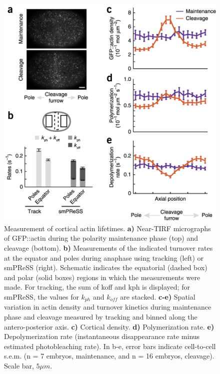 \begin{figure}[h!]
	\centering
	\includegraphics[width=0.8\hsize]{nmeth/nmethF4.jpg}
	\caption{Measurement of cortical actin lifetimes.  \textbf{a)} Near-TIRF micrographs of GFP::actin during the polarity maintenance phase (top) and cleavage (bottom). \textbf{b)} Measurements of the indicated turnover rates at the equator and poles during anaphase using tracking (left) or smPReSS (right). Schematic indicates the equatorial (dashed box) and polar (solid boxes) regions in which the measurements were made. For tracking, the sum of koff and kph is displayed; for smPReSS, the values for $k_{ph}$ and $k_{off}$ are stacked. \textbf{c-e)} Spatial variation in actin density and turnover kinetics during maintenance phase and cleavage measured by tracking and binned along the antero-posterior axis. \textbf{c)} Cortical density. \textbf{d)} Polymerization rate. \textbf{e)} Depolymerization rate (instantaneous disappearance rate minus estimated photobleaching rate). In b-e, error bars indicate cell-to-cell s.e.m. (n = 7 embryos, maintenance, and n = 16 embryos, cleavage). Scale bar, $5 \mu m$.} 
	
\end{figure}

